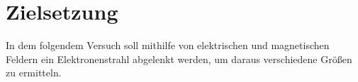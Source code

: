 \section{Zielsetzung}

\label{sec:Zielsetzung}

In dem folgendem Versuch soll mithilfe von elektrischen und magnetischen Feldern ein Elektronenstrahl
abgelenkt werden, um daraus verschiedene Größen zu ermitteln.
